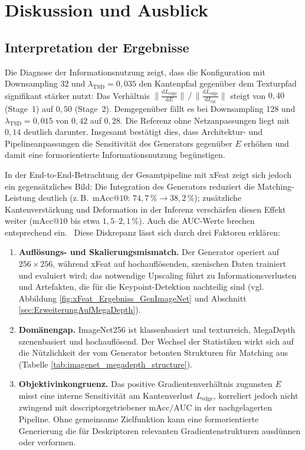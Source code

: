 \chapter{Diskussion und Ausblick}
\label{ch:DiskussionAusblick}


\section{Interpretation der Ergebnisse}
\label{sec:InterpretationErgebnisse}

Die Diagnose der Informationsnutzung zeigt, dass die Konfiguration mit Downsampling 32 und \(\lambda_{\text{TSD}}=0{,}035\) den Kantenpfad gegenüber dem Texturpfad signifikant stärker nutzt: Das Verhältnis \(\big\|\tfrac{\mathrm{d}L_{\text{edge}}}{\mathrm{d}E}\big\|\,/\,\big\|\tfrac{\mathrm{d}L_{\text{edge}}}{\mathrm{d}I_{\text{txt}}}\big\|\) steigt von \(0{,}40\) (Stage~1) auf \(0{,}50\) (Stage~2). Demgegenüber fällt es bei Downsampling 128 und \(\lambda_{\text{TSD}}=0{,}015\) von \(0{,}42\) auf \(0{,}28\). Die Referenz ohne Netzanpassungen liegt mit \(0{,}14\) deutlich darunter. Insgesamt bestätigt dies, dass Architektur- und Pipelineanpassungen die Sensitivität des Generators gegenüber \(E\) erhöhen und damit eine formorientierte Informationsnutzung begünstigen.

In der End-to-End-Betrachtung der Gesamtpipeline mit \ac{xFeat} zeigt sich jedoch ein gegensätzliches Bild: Die Integration des Generators reduziert die Matching-Leistung deutlich (z.\,B.\ \(\text{mAcc}@10\): \(74{,}7\,\%\rightarrow 38{,}2\,\%\)); zusätzliche Kantenverstärkung und Deformation in der Inferenz verschärfen diesen Effekt weiter (\(\text{mAcc}@10\) bis etwa \(1{,}5\text{–}2{,}1\,\%\)). Auch die \ac{AUC}-Werte brechen entsprechend ein. \,
Diese Diskrepanz lässt sich durch drei Faktoren erklären: 
\begin{enumerate}
    \item \textbf{Auflösungs- und Skalierungsmismatch.} Der Generator operiert auf \(256{\times}256\), während \ac{xFeat} auf hochauflösenden, szenischen Daten trainiert und evaluiert wird; das notwendige Upscaling führt zu Informationsverlusten und Artefakten, die für die Keypoint-Detektion nachteilig sind (vgl. Abbildung \ref{fig:xFeat_Ergebniss_GenImageNet} und Abschnitt \ref{sec:ErweiterungAufMegaDepth}). 
    

    \item \textbf{Domänengap.} ImageNet256 ist klassenbasiert und texturreich, MegaDepth szenenbasiert und hochauflösend. Der Wechsel der Statistiken wirkt sich auf die Nützlichkeit der vom Generator betonten Strukturen für Matching aus (Tabelle \ref{tab:imagenet_megadepth_structure}). 
    

    \item \textbf{Objektivinkongruenz.} Das positive Gradientenverhältnis zugunsten \(E\) misst eine interne Sensitivität am Kantenverlust \(L_{\text{edge}}\), korreliert jedoch nicht zwingend mit descriptorgetriebener \(\text{mAcc}/\text{AUC}\) in der nachgelagerten Pipeline. Ohne gemeinsame Zielfunktion kann eine formorientierte Generierung die für Deskriptoren relevanten Gradientenstrukturen ausdünnen oder verformen.
\end{enumerate}

